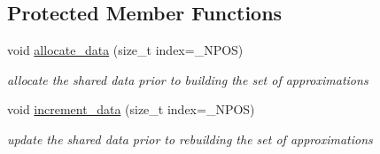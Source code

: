 \subsection*{Protected Member Functions}
\begin{DoxyCompactItemize}
\item 
void \hyperlink{classPecos_1_1SharedRegressOrthogPolyApproxData_af8c5dd497976d775d2c600c9950f6b2e}{allocate\+\_\+data} (size\+\_\+t index=\+\_\+\+N\+P\+OS)\label{classPecos_1_1SharedRegressOrthogPolyApproxData_af8c5dd497976d775d2c600c9950f6b2e}

\begin{DoxyCompactList}\small\item\em allocate the shared data prior to building the set of approximations \end{DoxyCompactList}\item 
void \hyperlink{classPecos_1_1SharedRegressOrthogPolyApproxData_a4890d7d6305c020f7b6885b46760bc1f}{increment\+\_\+data} (size\+\_\+t index=\+\_\+\+N\+P\+OS)\label{classPecos_1_1SharedRegressOrthogPolyApproxData_a4890d7d6305c020f7b6885b46760bc1f}

\begin{DoxyCompactList}\small\item\em update the shared data prior to rebuilding the set of approximations \end{DoxyCompactList}\end{DoxyCompactItemize}
